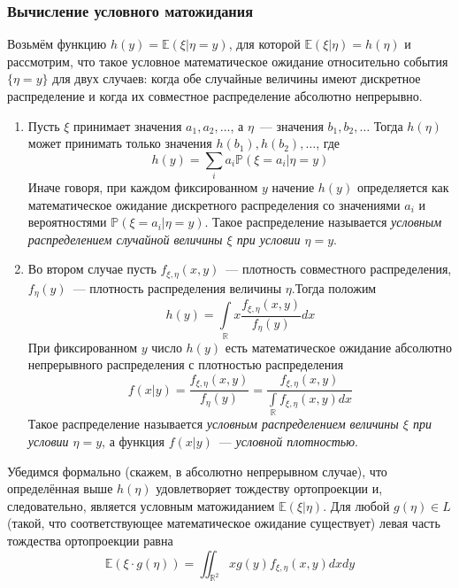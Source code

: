\documentclass[oneside,final,14pt]{extreport}
\theoremstyle{definition}
\begin{document}
\subsubsection{Вычисление условного матожидания}
Возьмём функцию $h(y)=\mathbb{E}(\xi | \eta=y)$, для которой $\mathbb{E}(\xi | \eta)=h(\eta)$ и рассмотрим, что такое условное математическое ожидание относительно события $\{\eta=y\}$ для двух случаев: когда обе случайные величины имеют дискретное распределение и когда их совместное распределение абсолютно непрерывно.
\begin{enumerate}
    \item Пусть $\xi$ принимает значения $a_{1}, a_{2}, \ldots$, а $\eta$~--- значения $b_{1}, b_{2}, \ldots$ Тогда $h(\eta)$ может принимать только значения $h\left(b_{1}\right), h\left(b_{2}\right), \ldots$, где
    \begin{equation*}
        h(y)=\sum_{i} a_{i} \mathbb{P}\left(\xi=a_{i} | \eta=y\right)
    \end{equation*}
    Иначе говоря, при каждом фиксированном $y$ начение $h(y)$ определяется как математическое ожидание дискретного распределения со значениями $a_{i}$ и вероятностями $\mathbb{P}\left(\xi=a_{i} | \eta=y\right)$. Такое распределение называется {\it условным распределением случайной величины $\xi$ при условии $\eta = y$}.
    
    \item Во втором случае пусть $f_{\xi, \eta}(x, y)$~--- плотность совместного распределения, $f_{\eta}(y)$~--- плотность распределения величины $\eta$.Тогда положим
    \begin{equation*}
        h(y)=\int\limits_{\mathbb{R}} x \frac{f_{\xi, \eta}(x, y)}{f_{\eta}(y)} d x
    \end{equation*}
    При фиксированном $y$ число $h(y)$ есть математическое ожидание абсолютно непрерывного распределения с плотностью распределения
    \begin{equation*}
        f(x | y)=\frac{f_{\xi, \eta}(x, y)}{f_{\eta}(y)}=\frac{f_{\xi, \eta}(x, y)}{\int\limits_{\mathbb{R}} f_{\xi, \eta}(x, y) d x}
    \end{equation*}
    Такое распределение называется {\it условным распределением величины $\xi$ при условии $\eta = y$}, а функция $f(x | y)$~--- {\it условной плотностью}.
\end{enumerate}

    Убедимся формально (скажем, в абсолютно непрерывном случае), что определённая выше $h(\eta)$ удовлетворяет тождеству ортопроекции и, следовательно, является условным матожиданием $\mathbb{E}(\xi | \eta)$. Для любой $g(\eta) \in L$ (такой, что соответствующее математическое ожидание существует) левая часть тождества ортопроекции равна
    \begin{equation*}
        \mathbb{E}(\xi \cdot g(\eta))=\iint_{\mathbb{R}^{2}} x g(y) f_{\xi, \eta}(x, y) d x d y
    \end{equation*}
    
\end{document}
